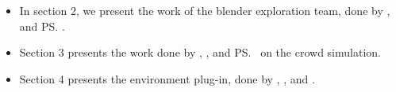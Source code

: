 \begin{itemize}
  \item In section 2, we present the work of the blender exploration team, done by \mr, \me and \ps.
  \item Section 3 presents the work done by \dl, \vl,
\js and \ps \ on the crowd simulation.
 \item Section 4 presents the environment
plug-in, done by \bb, \gc, \mr and \me.
\end{itemize}

  
